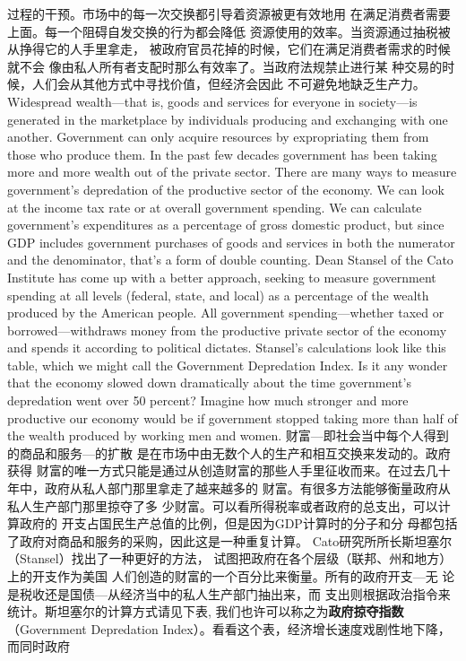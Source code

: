 \begin{paracol}{2}
过程的干预。市场中的每一次交换都引导着资源被更有效地用
在满足消费者需要上面。每一个阻碍自发交换的行为都会降低
资源使用的效率。当资源通过抽税被从挣得它的人手里拿走，
被政府官员花掉的时候，它们在满足消费者需求的时候就不会
像由私人所有者支配时那么有效率了。当政府法规禁止进行某
种交易的时候，人们会从其他方式中寻找价值，但经济会因此
不可避免地缺乏生产力。
\switchcolumn*
Widespread wealth---that is, goods and services for everyone
in society---is generated in the marketplace by individuals producing and exchanging with one another. Government can
only acquire resources by expropriating them from those who
produce them. In the past few decades government has been
taking more and more wealth out of the private sector. There
are many ways to measure government's depredation of the
productive sector of the economy. We can look at the income
tax rate or at overall government spending. We can calculate
government's expenditures as a percentage of gross domestic
product, but since GDP includes government purchases of
goods and services in both the numerator and the denominator,
that's a form of double counting. Dean Stansel of the Cato Institute has come up with a better approach, seeking to measure
government spending at all levels (federal, state, and local) as a
percentage of the wealth produced by the American people. All
government spending---whether taxed or borrowed---withdraws money from the productive private sector of the economy
and spends it according to political dictates. Stansel's calculations look like this table, which we might call the Government
Depredation Index. Is it any wonder that the economy slowed
down dramatically about the time government's depredation
went over 50 percent? Imagine how much stronger and more
productive our economy would be if government stopped taking more than half of the wealth produced by working men and
women.
\switchcolumn
财富---即社会当中每个人得到的商品和服务---的扩散
是在市场中由无数个人的生产和相互交换来发动的。政府获得
财富的唯一方式只能是通过从创造财富的那些人手里征收而来。在过去几十年中，政府从私人部门那里拿走了越来越多的
财富。有很多方法能够衡量政府从私人生产部门那里掠夺了多
少财富。可以看所得税率或者政府的总支出，可以计算政府的
开支占国民生产总值的比例，但是因为GDP计算时的分子和分
母都包括了政府对商品和服务的采购，因此这是一种重复计算。
Cato研究所所长斯坦塞尔（Stansel）找出了一种更好的方法，
试图把政府在各个层级（联邦、州和地方）上的开支作为美国
人们创造的财富的一个百分比来衡量。所有的政府开支---无
论是税收还是国债---从经济当中的私人生产部门抽出来，而
支出则根据政治指令来统计。斯坦塞尔的计算方式请见下表,
我们也许可以称之为\textbf{政府掠夺指数}（Government Depredation In­dex）。看看这个表，经济增长速度戏剧性地下降，而同时政府

\end{paracol}
